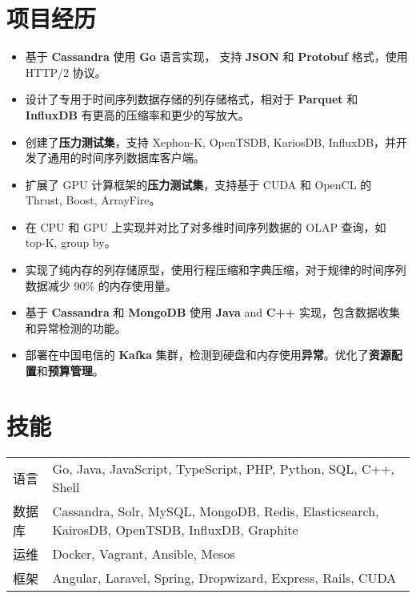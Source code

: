 \documentclass[11pt, letterpaper]{simple-cv}
\begin{document}
\section{项目经历}



\begin{itemize}
  \item 基于 \textbf{Cassandra} 使用 \textbf{Go} 语言实现， 支持 \textbf{JSON} 和 \textbf{Protobuf} 格式，使用 HTTP/2 协议。
  \item 设计了专用于时间序列数据存储的列存储格式，相对于 \textbf{Parquet} 和 \textbf{InfluxDB} 有更高的压缩率和更少的写放大。
  \item 创建了\textbf{压力测试集}，支持 Xephon-K, OpenTSDB, KariosDB, InfluxDB，并开发了通用的时间序列数据库客户端。
\end{itemize}


\begin{itemize}
  \item 扩展了 GPU 计算框架的\textbf{压力测试集}，支持基于 CUDA 和 OpenCL 的 Thrust, Boost, ArrayFire。
  \item 在 CPU 和 GPU 上实现并对比了对多维时间序列数据的 OLAP 查询，如 top-K, group by。
  \item 实现了纯内存的列存储原型，使用行程压缩和字典压缩，对于规律的时间序列数据减少 90\% 的内存使用量。
\end{itemize}


\begin{itemize}
  \item 基于 \textbf{Cassandra} 和 \textbf{MongoDB} 使用 \textbf{Java} and \textbf{C++} 实现，包含数据收集和异常检测的功能。
  \item 部署在中国电信的 \textbf{Kafka} 集群，检测到硬盘和内存使用\textbf{异常}。优化了\textbf{资源配置}和\textbf{预算管理}。
\end{itemize}

\section{技能}
\begin{tabular}{ l l }
 语言 &  Go, Java, JavaScript, TypeScript, PHP, Python, SQL, C++, Shell\\
 数据库 & Cassandra, Solr, MySQL, MongoDB, Redis, Elasticsearch, KairosDB, OpenTSDB, InfluxDB, Graphite\\
 运维 & Docker, Vagrant, Ansible, Mesos\\
 框架 & Angular, Laravel, Spring, Dropwizard, Express, Rails, CUDA
\end{tabular}
\end{document}
